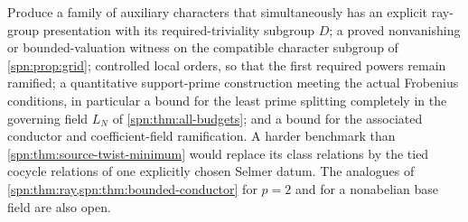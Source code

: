 \begin{question}\label{spn:q:twists}
Produce a family of auxiliary characters that simultaneously has an explicit
ray-group presentation with its required-triviality subgroup $D$; a proved
nonvanishing or bounded-valuation witness on the compatible character
subgroup of \cref{spn:prop:grid}; controlled local orders, so that the first
required powers remain ramified; a quantitative support-prime construction
meeting the actual Frobenius conditions, in particular a bound for the least
prime splitting completely in the governing field $L_N$ of
\cref{spn:thm:all-budgets}; and a bound for the associated conductor and
coefficient-field ramification. A harder benchmark than
\cref{spn:thm:source-twist-minimum} would replace its class relations by the
tied cocycle relations of one explicitly chosen Selmer datum. The analogues
of \cref{spn:thm:ray,spn:thm:bounded-conductor} for $p=2$ and for a
nonabelian base field are also open.
\end{question}
